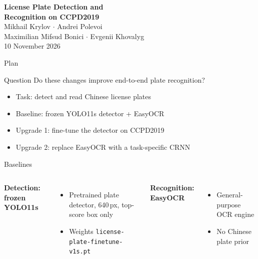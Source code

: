 \documentclass[10pt]{beamer}
\begin{document}
\begin{frame}[plain]
\begin{center}
\vspace*{2cm}
{\LARGE\bfseries License Plate Detection and\\ Recognition on CCPD2019}\\[1.0em]
Mikhail Krylov \(\cdot\) Andrei Polevoi \\[0.2em]
Maximilian Mifsud Bonici \(\cdot\) Evgenii Khovalyg\\[0.5em]
10 November 2026
\end{center}
\end{frame}

\begin{frame}{Plan}
\begin{block}{Question}
Do these changes improve end-to-end plate recognition?
\end{block}
\vspace{0.6em}
\begin{itemize}
  \item Task: detect and read Chinese license plates
  \item Baseline: frozen YOLO11s detector + EasyOCR
  \item Upgrade 1: fine-tune the detector on CCPD2019
  \item Upgrade 2: replace EasyOCR with a task-specific CRNN
\end{itemize}
\end{frame}

\begin{frame}{Baselines}
\begin{columns}
  \textbf{Detection: frozen YOLO11s}
  \begin{itemize}
    \item Pretrained plate detector, 640\,px, top-score box only
    \item Weights \texttt{license-plate-finetune-v1s.pt}
  \end{itemize}
  \textbf{Recognition: EasyOCR}
  \begin{itemize}
    \item General-purpose OCR engine
    \item No Chinese plate prior
  \end{itemize}
\end{columns}
\vspace{0.6em}
\end{frame}
\end{document}
